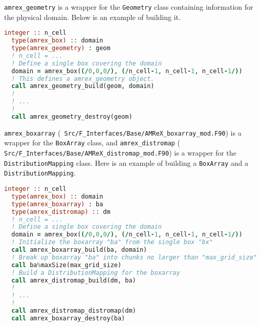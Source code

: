 {{\tt amrex\_geometry} is a wrapper for the {\tt Geometry} class
containing information for the physical domain.  Below is an example
of building it.
\begin{lstlisting}[language=fortran]
  integer :: n_cell
  type(amrex_box) :: domain
  type(amrex_geometry) : geom
  ! n_cell = ...
  ! Define a single box covering the domain
  domain = amrex_box((/0,0,0/), (/n_cell-1, n_cell-1, n_cell-1/))
  ! This defines a amrex_geometry object.
  call amrex_geometry_build(geom, domain)
  !
  ! ...
  !
  call amrex_geometry_destroy(geom)
\end{lstlisting}


{\tt amrex\_boxarray} ({\tt
  Src/F\_Interfaces/Base/AMReX\_boxarray\_mod.F90}) is a wrapper for
the {\tt BoxArray} class, and {\tt amrex\_distromap} ({\tt
  Src/F\_Interfaces/Base/AMReX\_distromap\_mod.F90}) is a wrapper for
the {\tt DistributionMapping} class.  Here is an example of
building a {\tt BoxArray} and a {\tt DistributionMapping}.
\begin{lstlisting}[language=fortran]
  integer :: n_cell
  type(amrex_box) :: domain
  type(amrex_boxarray) : ba
  type(amrex_distromap) :: dm
  ! n_cell = ...
  ! Define a single box covering the domain
  domain = amrex_box((/0,0,0/), (/n_cell-1, n_cell-1, n_cell-1/))
  ! Initialize the boxarray "ba" from the single box "bx"
  call amrex_boxarray_build(ba, domain)
  ! Break up boxarray "ba" into chunks no larger than "max_grid_size"
  call ba%maxSize(max_grid_size)
  ! Build a DistributionMapping for the boxarray
  call amrex_distromap_build(dm, ba)
  !
  ! ...
  !
  call amrex_distromap_distromap(dm)
  call amrex_boxarray_destroy(ba)
\end{lstlisting}

}
